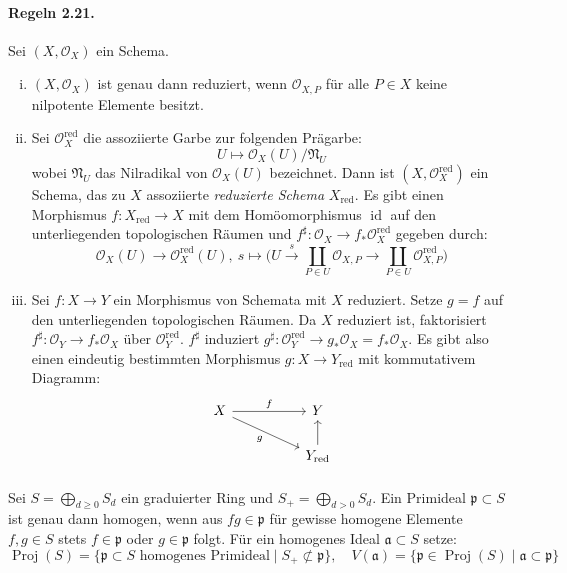 \documentclass[11pt,b5paper,openany]{memoir}
\begin{document}
\paragraph{Regeln 2.21.}\label{2.21} Sei $(X,\mathcal{O}_X)$ ein Schema.
\begin{enumerate}[(i)]
\item $(X, \mathcal{O}_X)$ ist genau dann reduziert, wenn $\mathcal{O}_{X,P}$ für alle $P\in X$ keine nilpotente Elemente besitzt.
\item Sei $\mathcal{O}_X^\text{red}$ die assoziierte Garbe zur folgenden Prägarbe:
\[ U \mapsto \mathcal{O}_X(U)/\mathfrak{N}_U \]
wobei $\mathfrak{N}_U$ das Nilradikal von $\mathcal{O}_X(U)$ bezeichnet. Dann ist $(X,\mathcal{O}_X^\text{red})$ ein Schema, das zu $X$ assoziierte \textit{reduzierte Schema} $X_\text{red}$. Es gibt einen Morphismus $f:X_\text{red}\to X$ mit dem Homöomorphismus $\operatorname{id}$ auf den unterliegenden topologischen Räumen und $f^\sharp:\mathcal{O}_X\to f_\ast\mathcal{O}_X^\text{red}$ gegeben durch:
\[\mathcal{O}_X(U)\to\mathcal{O}_X^\text{red}(U),\ s\mapsto \Big(U\stackrel{s}{\to}\coprod_{P\in U}\mathcal{O}_{X,P} \to\coprod_{P\in U}\mathcal{O}_{X,P}^\text{red}\Big) \]
\item Sei $f:X\to Y$ ein Morphismus von Schemata mit $X$ reduziert. Setze $g=f$ auf den unterliegenden topologischen Räumen. Da $X$ reduziert ist, faktorisiert $f^\sharp:\mathcal{O}_Y\to f_\ast\mathcal{O}_X$ über $\mathcal{O}_Y^\text{red}$. $f^\sharp$ induziert $g^\sharp:\mathcal{O}_Y^\text{red}\to g_\ast\mathcal{O}_X=f_\ast\mathcal{O}_X$. Es gibt also einen eindeutig bestimmten Morphismus $g:X\to Y_\text{red}$ mit kommutativem Diagramm:
\[\begin{tikzcd}
X\ar[rr, "f"]\ar[drr, "g"'] && Y\\
&& Y_\text{red}\ar[u]
\end{tikzcd} \]
\end{enumerate}

\paragraph{} Sei $S=\bigoplus_{d\geq 0} S_d$ ein graduierter Ring und $S_+=\bigoplus_{d>0}S_d$. Ein Primideal $\mathfrak{p}\subset S$ ist genau dann homogen, wenn aus $fg\in\mathfrak{p}$ für gewisse homogene Elemente $f,g\in S$ stets $f\in\mathfrak{p}$ oder $g\in\mathfrak{p}$ folgt. Für ein homogenes Ideal $\mathfrak{a}\subset S$ setze:
\[\operatorname{Proj}(S)=\{\mathfrak{p}\subset S\text{ homogenes Primideal}\mid S_+\not\subset\mathfrak{p}\},\quad V(\mathfrak{a})=\{\mathfrak{p}\in\operatorname{Proj}(S)\mid\mathfrak{a}\subset\mathfrak{p}\} \]
\end{document}
